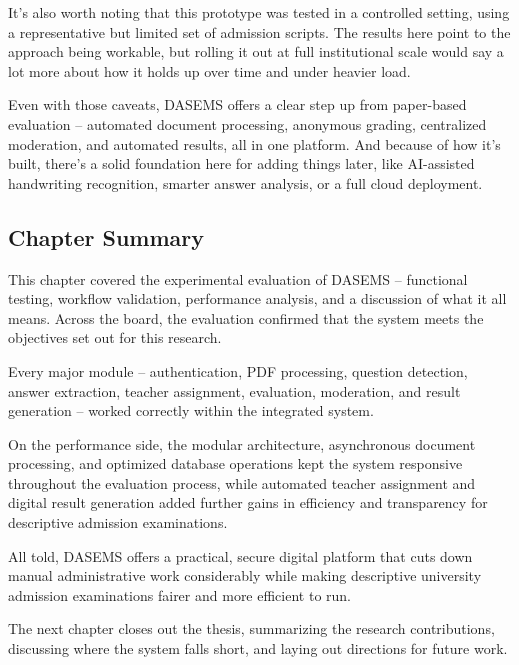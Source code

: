 It's also worth noting that this prototype was tested in a controlled setting, using a representative but limited set of admission scripts. The results here point to the approach being workable, but rolling it out at full institutional scale would say a lot more about how it holds up over time and under heavier load.

Even with those caveats, DASEMS offers a clear step up from paper-based evaluation -- automated document processing, anonymous grading, centralized moderation, and automated results, all in one platform. And because of how it's built, there's a solid foundation here for adding things later, like AI-assisted handwriting recognition, smarter answer analysis, or a full cloud deployment.

\subsection{Chapter Summary}

This chapter covered the experimental evaluation of DASEMS -- functional testing, workflow validation, performance analysis, and a discussion of what it all means. Across the board, the evaluation confirmed that the system meets the objectives set out for this research.

Every major module -- authentication, PDF processing, question detection, answer extraction, teacher assignment, evaluation, moderation, and result generation -- worked correctly within the integrated system.

On the performance side, the modular architecture, asynchronous document processing, and optimized database operations kept the system responsive throughout the evaluation process, while automated teacher assignment and digital result generation added further gains in efficiency and transparency for descriptive admission examinations.

All told, DASEMS offers a practical, secure digital platform that cuts down manual administrative work considerably while making descriptive university admission examinations fairer and more efficient to run.

The next chapter closes out the thesis, summarizing the research contributions, discussing where the system falls short, and laying out directions for future work.